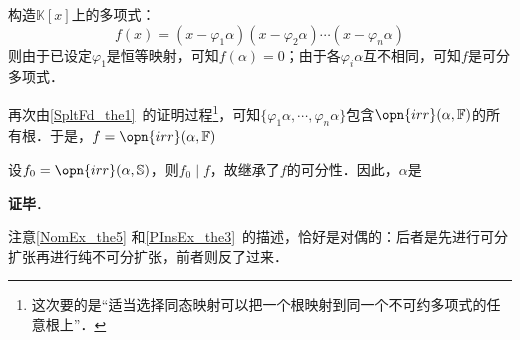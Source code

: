 构造$\mathbb{K}[x]$上的多项式：
\begin{equation}
f(x) = (x-\varphi_1\alpha)(x-\varphi_2\alpha)\cdots(x-\varphi_n\alpha)
\end{equation}
则由于已设定$\varphi_1$是恒等映射，可知$f(\alpha)=0$；由于各$\varphi_i\alpha$互不相同，可知$f$是可分多项式．

再次由\autoref{SpltFd_the1}~的证明过程\footnote{这次要的是“适当选择同态映射可以把一个根映射到同一个不可约多项式的任意根上”．}，可知$\{\varphi_1\alpha, \cdots, \varphi_n\alpha\}$包含$\opn{irr}(\alpha, \mathbb{F})$的所有根．于是，$f=\opn{irr}(\alpha, \mathbb{F})$

设$f_0 = \opn{irr}(\alpha, \mathbb{S})$，则$f_0\mid f$，故继承了$f$的可分性．因此，$\alpha$是

\textbf{证毕}．

注意\autoref{NomEx_the5} 和\autoref{PInsEx_the3}~的描述，恰好是对偶的：后者是先进行可分扩张再进行纯不可分扩张，前者则反了过来．
























